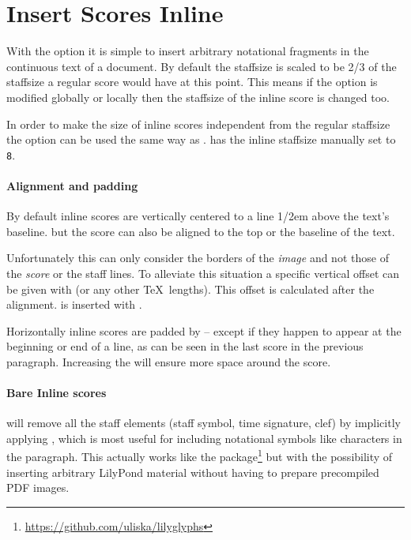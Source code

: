 \documentclass{lyluatexexample}
\begin{document}
\section*{Insert Scores Inline}

With the  option it is simple to insert arbitrary
notational fragments in the  continuous text of a
document. By default the staffsize is scaled to be 2/3 of the staffsize a
regular score would have at this point. This means if the 
option is modified globally or locally then the staffsize of the inline score is
changed too.

In order to make the size of inline scores independent from the regular
staffsize the option  can be used the same way as
.  has the inline
staffsize manually set to \texttt{8}.

\paragraph{Alignment and padding} By default inline scores are vertically
centered to a line 1/2em above the text's baseline.  but the score can also be aligned  to the top or the baseline of the text.

Unfortunately this can only consider the borders of the \emph{image} and not
those of the \emph{score} or the staff lines. To alleviate this situation a
specific vertical offset can be given with  (or any other
\TeX\ lengths). This offset is calculated after the alignment.
 is inserted with
.

Horizontally inline scores are padded by  -- except if
they happen to appear at the beginning or end of a line, as can be seen in the
last score in the previous paragraph. 
Increasing the  will ensure more space around the score.

\paragraph{Bare Inline scores}  will remove all the
staff elements (staff symbol, time signature, clef) by implicitly applying
, which is most useful for including notational symbols like
characters in the paragraph.
This actually works like the 
package\footnote{\url{https://github.com/uliska/lilyglyphs}} but with the
possibility of inserting arbitrary LilyPond material without having to prepare
precompiled PDF images.
\end{document}
